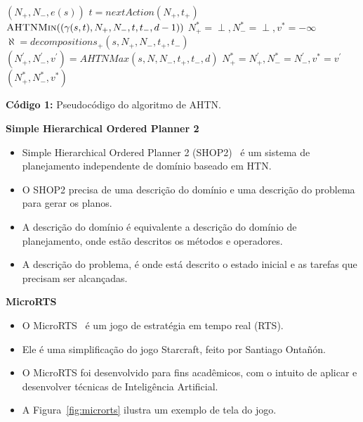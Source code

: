 \documentclass[a0,portrait]{a0poster}
\newcommand\itemadjust{\itemsep.5em \parskip0pt \parsep0pt}
\begin{document}
\begin{multicols}{2}
	\vspace{8mm}
	
	\begin{flushleft}
	{\large
		\begin{algorithmic}[1]
			\label{alg:lin:firstLine}
			\State	\Return $(N_{+}, N_{-}, e(s))$
			\EndIf
			 \label{alg:ahtn:nexaction}
			\State $t = nextAction(N_{+}, t_{+})$ 
			\State \Return $\Call{AHTNMin}{(\gamma(s,t), N_{+}, N_{-}, t, t_{-}, d-1)}$ \label{alg:ahtn:troca}
			\EndIf
			\State $N_{+}^{*} = \perp, N_{-}^{*} = \perp, v^{*} = -\infty$
			\State $\aleph = decompositions_{+}(s, N_{+}, N_{-}, t_{+}, t_{-})$ \label{alg:decompositions}
			 \label{alg:ahtn:for}
			\State $(N^{'}_{+}, N^{'}_{-}, v^{'}) = AHTNMax(s, N, N_{-}, t_{+}, t_{-}, d)$
			\State $N_{+}^{*} = N^{'}_{+}, N_{-}^{*} = N^{'}_{-}, v^{*} = v^{'} $
			\EndIf
			\EndFor		
			\State \Return $(N_{+}^{*}, N_{-}^{*}, v^{*} )$
			\EndFunction
		\end{algorithmic}
	}
	\begin{center}
		\textbf{Código 1:} Pseudocódigo do algoritmo de AHTN.
	\end{center}
	\end{flushleft}

	\vspace{10mm}
	
	\textbf{Simple Hierarchical Ordered Planner 2}
	\begin{itemize}
		\item Simple Hierarchical Ordered Planner 2 (SHOP2)~\cite{nau2003shop2} é um sistema de planejamento independente de domínio baseado em HTN.
		\item O SHOP2 precisa de uma descrição do domínio e uma descrição do problema para gerar os planos.
		\item A descrição do domínio é equivalente a descrição do domínio de planejamento, onde estão descritos os métodos e operadores.
		\item A descrição do problema, é onde está descrito o estado inicial e as tarefas que precisam ser alcançadas.
	\end{itemize}
	
	\vspace{10mm}
	\textbf{MicroRTS}
	\begin{itemize}
		\item O MicroRTS~\cite{ontanon2013combinatorial} é um jogo de estratégia em tempo real (RTS).
		\item Ele é uma simplificação do jogo Starcraft, feito por Santiago Ontañón.
		\item O MicroRTS foi desenvolvido para fins acadêmicos, com o intuito de aplicar e desenvolver técnicas de Inteligência Artificial.
		\item A Figura~\ref{fig:microrts} ilustra um exemplo de tela do jogo.
	\end{itemize}
	

\end{multicols}
\end{document}
